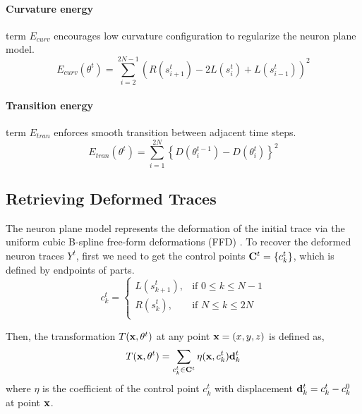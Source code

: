\documentclass[10pt,letterpaper]{article}
\begin{document}
\paragraph{Curvature energy} term $E_{curv}$ encourages low curvature configuration to regularize the neuron plane model.
\begin{equation}
E_{curv}(\theta^t) = \sum_{i=2}^{2N-1} (R(s_{i+1}^t) - 2L(s_i^t) + L(s_{i-1}^t))^2
\end{equation} 

\paragraph{Transition energy} term $E_{tran}$ enforces smooth transition between adjacent time steps.
\begin{equation}
E_{tran}(\theta^t) = \sum_{i=1}^{2N} \left\{ D(\theta_i^{t-1}) - D(\theta_i^t) \right\}^2
\end{equation}


\subsection{Retrieving Deformed Traces} \label{sec:gettrace}
The neuron plane model represents the deformation of the initial trace via the uniform cubic B-spline
free-form deformations (FFD) \cite{Rueckert1999}. To recover the deformed neuron traces $Y^t$, first we need to get the control points ${\bf C}^t = \{c_k^t\}$, which is defined by endpoints of parts.
\begin{equation}
c_k^t = 
\begin{cases}
L(s_{k+1}^t), & \text{if } 0 \leq k \leq N-1 \\
R(s_k^t), & \text{if } N \leq k \leq 2N \\
\end{cases}
\end{equation}

Then, the transformation $T({\bf x}, \theta^t)$ at any point ${\bf x} = (x,y,z)$ is defined as,
\begin{equation}
T({\bf x}, \theta^t) = \sum_{c_k^t \in {\bf C}^t} \eta({\bf x}, c_k^t) {\bf d}_k^t
\end{equation}
where $\eta$ is the coefficient of the control point $c_k^t$ with displacement ${\bf d}_k^t = c_k^t - c_k^0$ at point ${\bf x}$.
\end{document}

